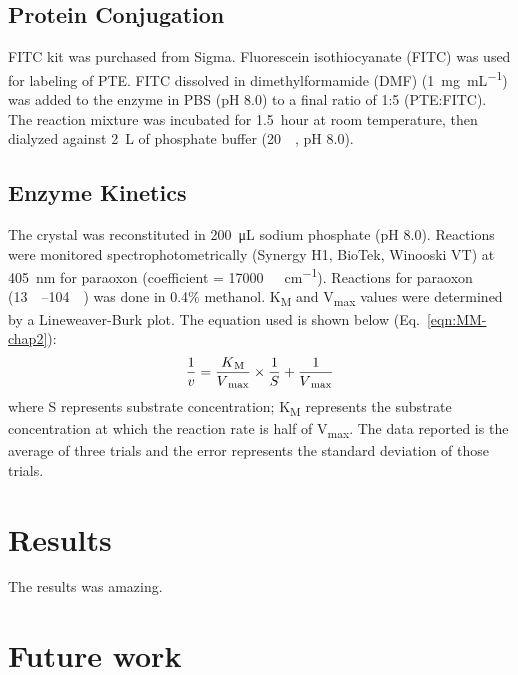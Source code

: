 \begin{refsection}
\subsection{Protein Conjugation}

FITC kit was purchased from Sigma. Fluorescein isothiocyanate (FITC) was used
for labeling of PTE. FITC dissolved in dimethylformamide (DMF)
(\SI{1}{\mg\per\mL}) was added to the enzyme in PBS (pH 8.0) to a final ratio
of 1:5 (PTE:FITC). The reaction mixture was incubated for \SI{1.5}{hour} at room
temperature, then dialyzed against \SI{2}{\liter} of phosphate buffer
(\SI{20}{\milli\Molar}, pH 8.0). 

\subsection{Enzyme Kinetics}

The crystal was reconstituted in \SI{200}{\micro\liter} sodium phosphate (pH
8.0). Reactions were monitored spectrophotometrically (Synergy H1, BioTek,
Winooski VT) at \SI{405}{\nm} for paraoxon (coefficient =
\SI{17000}{\per\Molar\per\cm}).  Reactions for paraoxon
(\SIrange{13}{104}{\micro\Molar}) was done in 0.4\% methanol.
K\textsubscript{M} and V\textsubscript{max} values were determined by a
Lineweaver-Burk plot.\cite{Baker2011b} The equation used is shown below
(Eq.~\ref{eqn:MM-chap2}): 
\begin{equation} 
    \frac{1}{v} =
    \frac{K\textsubscript{M}}{V\textsubscript{max}}\times\frac{1}{S} +
    \frac{1}{V\textsubscript{max}} 
    \label{eqn:MM-chap3}
\end{equation}
where S represents substrate concentration; K\textsubscript{M} represents the
substrate concentration at which the reaction rate is half of
V\textsubscript{max}. The data reported is the average of three trials and the
error represents the standard deviation of those trials.

\section{Results}

The results was amazing.

\section{Future work}

\printbibliography[heading=subbibliography]

\end{refsection}
